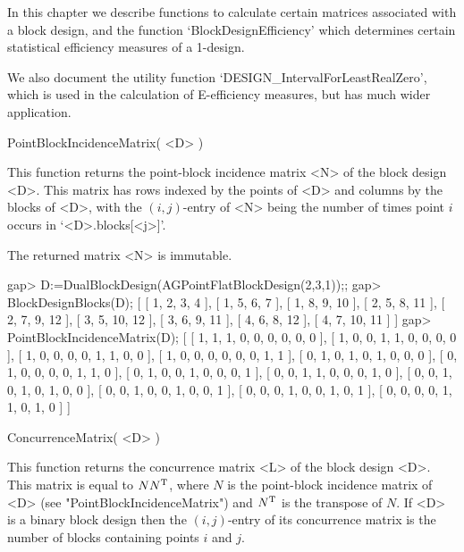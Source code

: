 %
%
%
%
\def\DESIGN{\sf DESIGN}
\def\GRAPE{\sf GRAPE}
\def\nauty{\it nauty}
\def\Aut{{\rm Aut}\,}
\def\x{\times}

In this chapter we describe functions to calculate certain matrices
associated with a block design, and the function `BlockDesignEfficiency'
which determines certain statistical efficiency measures of a 1-design.

We also document the utility function `DESIGN_IntervalForLeastRealZero',
which is used in the calculation of E-efficiency measures, but has much
wider application.


\>PointBlockIncidenceMatrix( <D> )

This function returns the point-block incidence matrix <N> of the
block design <D>.  This matrix has rows indexed by the points of <D>
and columns by the blocks of <D>, with the $(i,j)$-entry of <N> being
the number of times point $i$ occurs in `<D>.blocks[<j>]'.

The returned matrix <N> is immutable. 

\beginexample
gap> D:=DualBlockDesign(AGPointFlatBlockDesign(2,3,1));;
gap> BlockDesignBlocks(D);
[ [ 1, 2, 3, 4 ], [ 1, 5, 6, 7 ], [ 1, 8, 9, 10 ], [ 2, 5, 8, 11 ], 
  [ 2, 7, 9, 12 ], [ 3, 5, 10, 12 ], [ 3, 6, 9, 11 ], [ 4, 6, 8, 12 ], 
  [ 4, 7, 10, 11 ] ]
gap> PointBlockIncidenceMatrix(D);
[ [ 1, 1, 1, 0, 0, 0, 0, 0, 0 ], [ 1, 0, 0, 1, 1, 0, 0, 0, 0 ], 
  [ 1, 0, 0, 0, 0, 1, 1, 0, 0 ], [ 1, 0, 0, 0, 0, 0, 0, 1, 1 ], 
  [ 0, 1, 0, 1, 0, 1, 0, 0, 0 ], [ 0, 1, 0, 0, 0, 0, 1, 1, 0 ], 
  [ 0, 1, 0, 0, 1, 0, 0, 0, 1 ], [ 0, 0, 1, 1, 0, 0, 0, 1, 0 ], 
  [ 0, 0, 1, 0, 1, 0, 1, 0, 0 ], [ 0, 0, 1, 0, 0, 1, 0, 0, 1 ], 
  [ 0, 0, 0, 1, 0, 0, 1, 0, 1 ], [ 0, 0, 0, 0, 1, 1, 0, 1, 0 ] ]
\endexample

\>ConcurrenceMatrix( <D> )

This function returns the concurrence matrix <L> of the block design <D>.
This matrix is equal to $NN^{\rm T}$, where $N$ is the point-block
incidence matrix of <D> (see "PointBlockIncidenceMatrix") and 
$N^{\rm T}$ is the transpose of $N$. If <D> is a binary block design
then the $(i,j)$-entry of its concurrence matrix is the number of blocks
containing points $i$ and $j$.


